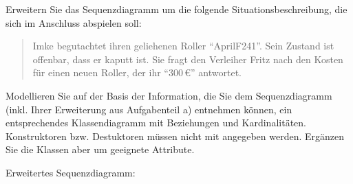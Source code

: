 \documentclass[a4paper]{scrartcl}
\begin{document}
\begin{aufgabe}
    \begin{teilaufgaben}
        \teilaufgabe[5] Erweitern Sie das Sequenzdiagramm um die folgende Situationsbeschreibung, die sich im Anschluss abspielen soll:
            \begin{quotation}
                Imke begutachtet ihren geliehenen Roller \enquote{AprilF241}. Sein Zustand ist offenbar, dass er kaputt ist. Sie fragt den Verleiher Fritz nach den Kosten für einen neuen Roller, der ihr \enquote{300\,\euro} antwortet.
            \end{quotation}
        \teilaufgabe[10] Modellieren Sie auf der Basis der Information, die Sie dem Sequenzdiagramm (inkl. Ihrer Erweiterung aus Aufgabenteil a) entnehmen können, ein entsprechendes Klassendiagramm mit Beziehungen und Kardinalitäten. Konstruktoren bzw. Destuktoren müssen nicht mit angegeben werden. Ergänzen Sie die Klassen aber um geeignete Attribute.
    \end{teilaufgaben}
    \begin{loesung}
        \begin{teilaufgaben}
            \teilaufgabe Erweitertes Sequenzdiagramm:


\end{teilaufgaben}
\end{loesung}
\end{aufgabe}
\end{document}
